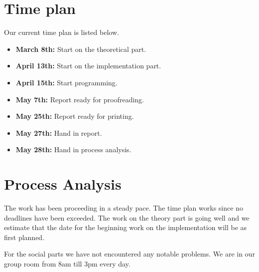 \documentclass{article}
\begin{document}
\section{Time plan}
Our current time plan is listed below. 
\begin{itemize}
	\item \textbf{March 8th:} Start on the theoretical part.
	\item \textbf{April 13th:} Start on the implementation part.
	\item \textbf{April 15th:} Start programming. 
	\item \textbf{May 7th:} Report ready for proofreading.
	\item \textbf{May 25th:} Report ready for printing.
	\item \textbf{May 27th:} Hand in report.
	\item \textbf{May 28th:} Hand in process analysis.
\end{itemize}


\section{Process Analysis}
The work has been proceeding in a steady pace. The time plan works since no deadlines have been exceeded. The work on the theory part is going well and we estimate that the date for the beginning work on the implementation will be as first planned. 

For the social parts we have not encountered any notable problems. We are in our group room from 8am till 3pm every day.
\end{document}
